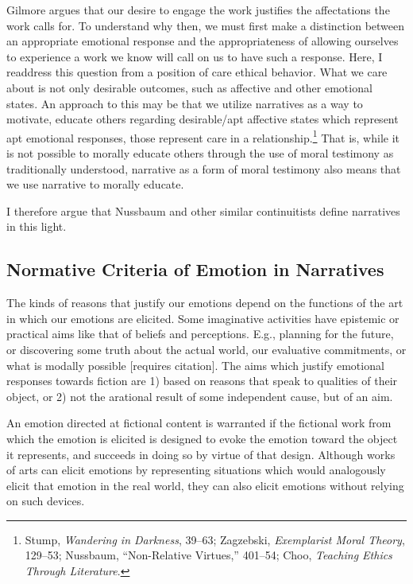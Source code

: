 \documentclass[phdthesis,12pt,final]{wuthesis}
\theoremstyle{definition}
\theoremstyle{definition}
\theoremstyle{definition}
\theoremstyle{definition}
\theoremstyle{remark}
\begin{document}
Gilmore argues that our desire to engage the work justifies the affectations the work calls for. To understand why then, we must first make a distinction between an appropriate emotional response and the appropriateness of allowing ourselves to experience a work we know will call on us to have such a response. Here, I readdress this question from a position of care ethical behavior. What we care about is not only desirable outcomes, such as affective and other emotional states. An approach to this may be that we utilize narratives as a way to motivate, educate others regarding desirable/apt affective states which represent apt emotional responses, those represent care in a relationship.\footnote{Stump, \emph{Wandering in {Darkness}}, 39--63; Zagzebski, \emph{Exemplarist {Moral Theory}}, 129--53; Nussbaum, {``Non-Relative Virtues,''} 401--54; Choo, \emph{Teaching Ethics Through Literature}.} That is, while it is not possible to morally educate others through the use of moral testimony as traditionally understood, narrative as a form of moral testimony also means that we use narrative to morally educate.

I therefore argue that Nussbaum and other similar continuitists define narratives in this light.

\subsection*{Normative Criteria of Emotion in Narratives}\label{normative-criteria-of-emotion-in-narratives}

The kinds of reasons that justify our emotions depend on the functions of the art in which our emotions are elicited. Some imaginative activities have epistemic or practical aims like that of beliefs and perceptions. E.g., planning for the future, or discovering some truth about the actual world, our evaluative commitments, or what is modally possible {[}requires citation{]}. The aims which justify emotional responses towards fiction are 1) based on reasons that speak to qualities of their object, or 2) not the arational result of some independent cause, but of an aim.

An emotion directed at fictional content is warranted if the fictional work from which the emotion is elicited is designed to evoke the emotion toward the object it represents, and succeeds in doing so by virtue of that design. Although works of arts can elicit emotions by representing situations which would analogously elicit that emotion in the real world, they can also elicit emotions without relying on such devices.
\end{document}
